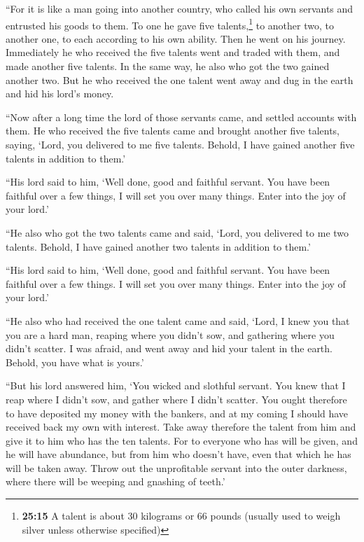  ``For it is like a man going into another country, who
called his own servants and entrusted his goods to them. 
To one he gave five talents,\footnote{\textbf{25:15} A talent is about
  30 kilograms or 66 pounds (usually used to weigh silver unless
  otherwise specified)} to another two, to another one, to each
according to his own ability. Then he went on his journey.
 Immediately he who received the five talents went and
traded with them, and made another five talents.  In the
same way, he also who got the two gained another two. 
But he who received the one talent went away and dug in the earth and
hid his lord's money.

 ``Now after a long time the lord of those servants came,
and settled accounts with them.  He who received the five
talents came and brought another five talents, saying, `Lord, you
delivered to me five talents. Behold, I have gained another five talents
in addition to them.'

 ``His lord said to him, `Well done, good and faithful
servant. You have been faithful over a few things, I will set you over
many things. Enter into the joy of your lord.'

 ``He also who got the two talents came and said, `Lord,
you delivered to me two talents. Behold, I have gained another two
talents in addition to them.'

 ``His lord said to him, `Well done, good and faithful
servant. You have been faithful over a few things. I will set you over
many things. Enter into the joy of your lord.'

 ``He also who had received the one talent came and said,
`Lord, I knew you that you are a hard man, reaping where you didn't sow,
and gathering where you didn't scatter.  I was afraid,
and went away and hid your talent in the earth. Behold, you have what is
yours.'

 ``But his lord answered him, `You wicked and slothful
servant. You knew that I reap where I didn't sow, and gather where I
didn't scatter.  You ought therefore to have deposited my
money with the bankers, and at my coming I should have received back my
own with interest.  Take away therefore the talent from
him and give it to him who has the ten talents.  For to
everyone who has will be given, and he will have abundance, but from him
who doesn't have, even that which he has will be taken away.
 Throw out the unprofitable servant into the outer
darkness, where there will be weeping and gnashing of teeth.'

